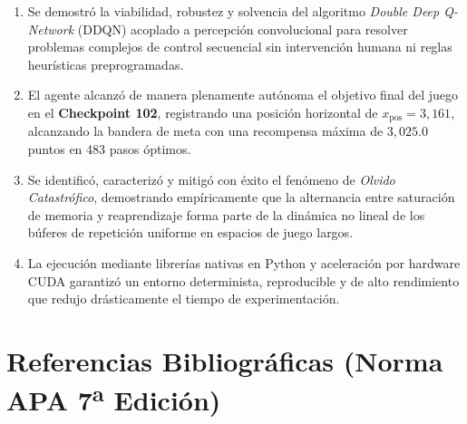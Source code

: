\documentclass[11pt,letterpaper]{article}
\begin{document}
\begin{enumerate}
    \item Se demostró la viabilidad, robustez y solvencia del algoritmo \textit{Double Deep Q-Network} (DDQN) acoplado a percepción convolucional para resolver problemas complejos de control secuencial sin intervención humana ni reglas heurísticas preprogramadas.
    \item El agente alcanzó de manera plenamente autónoma el objetivo final del juego en el \textbf{Checkpoint 102}, registrando una posición horizontal de $x_{\text{pos}} = 3,161$, alcanzando la bandera de meta con una recompensa máxima de $3,025.0$ puntos en 483 pasos óptimos.
    \item Se identificó, caracterizó y mitigó con éxito el fenómeno de \textit{Olvido Catastrófico}, demostrando empíricamente que la alternancia entre saturación de memoria y reaprendizaje forma parte de la dinámica no lineal de los búferes de repetición uniforme en espacios de juego largos.
    \item La ejecución mediante librerías nativas en Python y aceleración por hardware CUDA garantizó un entorno determinista, reproducible y de alto rendimiento que redujo drásticamente el tiempo de experimentación.
\end{enumerate}

\newpage

\section{Referencias Bibliográficas (Norma APA 7\textsuperscript{a} Edición)}
\end{document}

